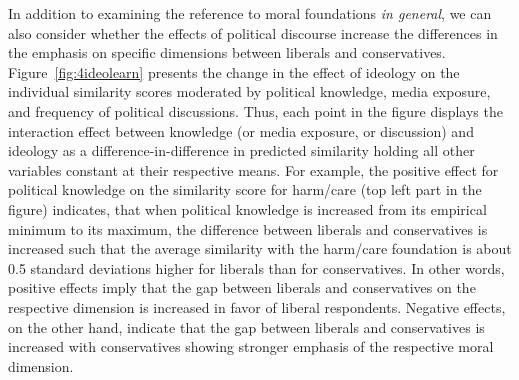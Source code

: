 \documentclass[12pt]{article}
\begin{document}
In addition to examining the reference to moral foundations \textit{in general}, we can also consider whether the effects of political discourse increase the differences in the emphasis on specific dimensions between liberals and conservatives. Figure~\ref{fig:4ideolearn} presents the change in the effect of ideology on the individual similarity scores moderated by political knowledge, media exposure, and frequency of political discussions. Thus, each point in the figure displays the interaction effect between knowledge (or media exposure, or discussion) and ideology as a difference-in-difference in predicted similarity holding all other variables constant at their respective means. For example, the positive effect for political knowledge on the similarity score for harm/care (top left part in the figure) indicates, that when political knowledge is increased from its empirical minimum to its maximum, the difference between liberals and conservatives is increased such that the average similarity with the harm/care foundation is about 0.5 standard deviations higher for liberals than for conservatives. In other words, positive effects imply that the gap between liberals and conservatives on the respective dimension is increased in favor of liberal respondents. Negative effects, on the other hand, indicate that the gap between liberals and conservatives is increased with conservatives showing stronger emphasis of the respective moral dimension.
\end{document}

